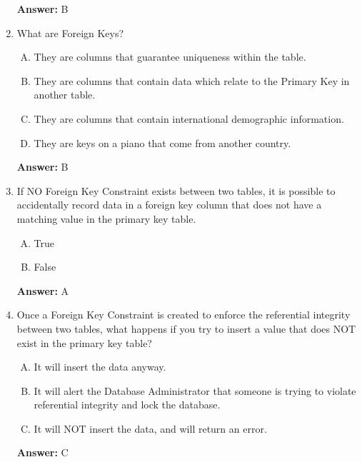 \documentclass[12pt]{article}
\begin{document}
\begin{enumerate}[1.]
    \bigskip

    \textbf{Answer:} B

    \item

    \bigskip

    What are Foreign Keys?

    \bigskip

    \begin{enumerate}[A.]
        \item They are columns that guarantee uniqueness within the table.
        \item They are columns that contain data which relate to the Primary Key in another table.
        \item They are columns that contain international demographic information.
        \item They are keys on a piano that come from another country.

    \end{enumerate}

    \bigskip

    \textbf{Answer:} B

    \item

    If NO Foreign Key Constraint exists between two tables, it is possible to
    accidentally record data in a foreign key column that does not have a matching
    value in the primary key table.

    \bigskip

    \begin{enumerate}[A.]
        \item True
        \item False
    \end{enumerate}

    \bigskip

    \textbf{Answer:} A

    \item

    Once a Foreign Key Constraint is created to enforce the referential
    integrity between two tables, what happens if you try to insert a value that
    does NOT exist in the primary key table?

    \bigskip

    \begin{enumerate}[A.]
        \item It will insert the data anyway.
        \item It will alert the Database Administrator that someone is trying to violate referential integrity and lock the database.
        \item It will NOT insert the data, and will return an error.
    \end{enumerate}

    \bigskip

    \textbf{Answer:} C


\end{enumerate}
\end{document}
